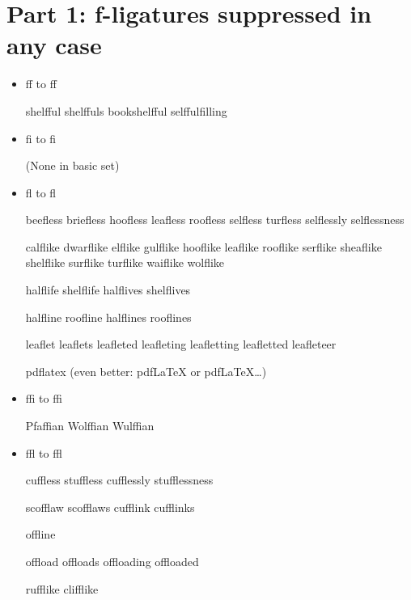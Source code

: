 


\section*{Part 1: f-ligatures suppressed in any case}


\begin{itemize}

\item ff to f\hspace{0pt}f

shelfful shelffuls bookshelfful selffulfilling


\item fi to f\hspace{0pt}i

(None in basic set)

\item fl to f\hspace{0pt}l

beefless briefless hoofless leafless roofless selfless turfless selflessly selflessness

calflike dwarflike elflike gulflike hooflike leaflike rooflike serflike sheaflike shelflike surflike turflike waiflike wolflike

halflife shelflife
halflives shelflives

halfline roofline
halflines rooflines

leaflet leaflets leafleted leafleting leafletting leafletted leafleteer

pdflatex (even better: pdfLaTeX or pdf\LaTeX\ldots)


\item ffi to ff\hspace{0pt}i

Pfaffian Wolffian Wulffian


\item ffl to ff\hspace{0pt}l

cuffless stuffless cufflessly stufflessness

scofflaw scofflaws cufflink cufflinks

offline

offload offloads offloading offloaded

rufflike clifflike



\end{itemize}
